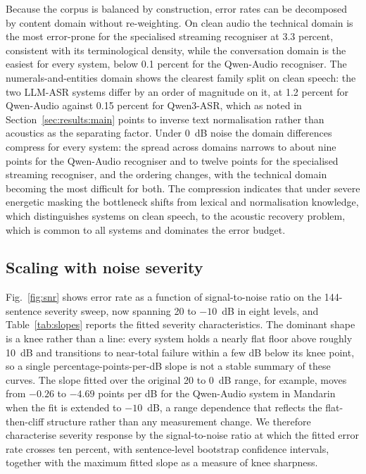 Because the corpus is balanced by construction, error rates can be
decomposed by content domain without re-weighting. On clean audio the
technical domain is the most error-prone for the specialised streaming
recogniser at 3.3 percent, consistent with its terminological density, while
the conversation domain is the easiest for every system, below 0.1 percent for the Qwen-Audio recogniser. The numerals-and-entities domain shows the
clearest family split on clean speech: the two LLM-ASR systems differ by an
order of magnitude on it, at 1.2 percent for Qwen-Audio against 0.15 percent
for Qwen3-ASR, which as noted in Section~\ref{sec:results:main} points to
inverse text normalisation rather than acoustics as the separating factor.
Under 0~dB noise the domain differences compress for every system: the
spread across domains narrows to about nine points for the Qwen-Audio
recogniser and to twelve points for the specialised streaming recogniser,
and the ordering changes, with the technical domain becoming the most
difficult for both. The compression indicates that under severe energetic
masking the bottleneck shifts from lexical and normalisation knowledge,
which distinguishes systems on clean speech, to the acoustic recovery
problem, which is common to all systems and dominates the error budget.

\subsection{Scaling with noise severity}
\label{sec:results:snr}

Fig.~\ref{fig:snr} shows error rate as a function of signal-to-noise ratio
on the 144-sentence severity sweep, now spanning 20 to $-10$~dB in eight
levels, and Table~\ref{tab:slopes} reports the fitted severity
characteristics. The dominant shape is a knee rather than a line: every
system holds a nearly flat floor above roughly 10~dB and transitions to
near-total failure within a few dB below its knee point, so a single
percentage-points-per-dB slope is not a stable summary of these curves. The
slope fitted over the original 20 to 0~dB range, for example, moves from
$-0.26$ to $-4.69$ points per dB for the Qwen-Audio system in Mandarin when
the fit is extended to $-10$~dB, a range dependence that reflects the
flat-then-cliff structure rather than any measurement change. We therefore
characterise severity response by the signal-to-noise ratio at which the
fitted error rate crosses ten percent, with sentence-level bootstrap
confidence intervals, together with the maximum fitted slope as a measure
of knee sharpness.

